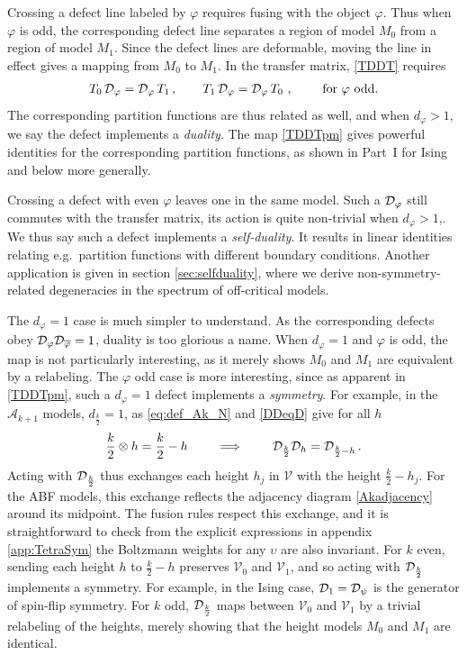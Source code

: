 Crossing a defect line labeled by $\varphi$ requires fusing with the object $\varphi$. Thus when $\varphi$ is odd, the corresponding defect line separates a region of model $M_0$ from a region of model $M_1$. Since the defect lines are deformable, moving the line in effect gives a mapping from $M_0$ to $M_1$.
In the transfer matrix, \eqref{TDDT} requires 
\begin{align}
T_0\, \mathcal{D}_{\varphi}= \mathcal{D}_{\varphi}\, T_1 \,,\qquad  T_1\,\mathcal{D}_{\varphi}= \mathcal{D}_{\varphi} \,T_0\ ,\qquad\hbox{ for }\varphi\hbox{ odd.}
\label{TDDTpm}
\end{align}
The corresponding partition functions are thus related as well, and when $d_\varphi>1$, we say the defect implements a {\em duality}.  The map \eqref{TDDTpm} gives powerful identities for the corresponding partition functions,  as shown in Part~I for Ising and below more generally.  



Crossing a defect with even $\varphi$ leaves one in the same model. Such a $\mathcal{D}_\varphi$ still commutes with the transfer matrix,  its action is quite non-trivial when $d_\varphi>1$,. We thus say such a defect implements a {\em self-duality}. It results in linear identities relating e.g.\ partition functions with different boundary conditions. Another application is given in section \ref{sec:selfduality}, where we derive non-symmetry-related degeneracies in the spectrum of off-critical models. 



The $d_\varphi=1$ case is much simpler to understand.
As the corresponding defects obey $\mathcal{D}_\varphi\mathcal{D}_{\overline\varphi}=1$, duality is too glorious a name.
When $d_\varphi=1$ and $\varphi$ is odd, the map is not particularly interesting, as it merely shows $M_0$ and $M_1$ are equivalent by a relabeling.  The $\varphi$ odd case is more interesting, since as apparent in \eqref{TDDTpm}, such a $d_\varphi=1$ defect implements a {\em symmetry}.
For example, in the $\mathcal{A}_{k+1}$ models, $d_{\frac{k}2}=1$, as \eqref{eq:def_Ak_N} and  \eqref{DDeqD} give for all $h$
\begin{align}
\frac{k}2 \otimes h =\frac{k}{2}-h \qquad \implies\qquad \mathcal{D}_{\frac{k}{2}}\mathcal{D}_h=\mathcal{D}_{\frac{k}{2}-h}\,.
\label{heightflip}
\end{align}
Acting with $\mathcal{D}_{\frac{k}{2}}$ thus exchanges each height $h_j$ in $\mathcal{V}$ with the height $\tfrac{k}{2} -h_j$. For the ABF models, this exchange reflects the adjacency diagram \eqref{Akadjacency} around its midpoint. The fusion rules respect this exchange,  and it is straightforward to check from the explicit expressions in appendix \ref{app:TetraSym} the Boltzmann weights for any $\upsilon$ are also invariant. For $k$ even, sending each height $h$ to $\tfrac{k}{2}-h$ preserves $\mathcal{V}_0$ and $\mathcal{V}_1$, and so acting with $\mathcal{D}_{\frac{k}{2}}$ implements a symmetry. For example, in the Ising case, $\mathcal{D}_1=\mathcal{D}_\psi$ is the generator of spin-flip symmetry. For $k$ odd, $\mathcal{D}_{\frac{k}{2}}$ maps between $\mathcal{V}_0$ and $\mathcal{V}_1$ by a trivial relabeling of the heights, merely showing that the height models ${M}_0$ and ${M}_1$ are identical. 


